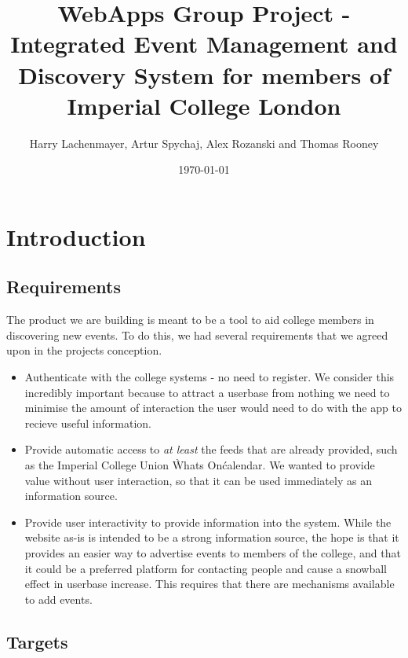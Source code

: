 \documentclass[11pt]{article}
\begin{document}
\title{WebApps Group Project - Integrated Event Management and Discovery System for members of Imperial College London}

\author{Harry Lachenmayer, Artur Spychaj, Alex Rozanski and Thomas Rooney}

\date{\today}         %

\maketitle            %

\section {Introduction}

\subsection {Requirements}

The product we are building is meant to be a tool to aid college members in discovering new events. To do this, we had several requirements that we agreed upon in the projects conception.

\begin{itemize}
\item Authenticate with the college systems - no need to register. We consider this incredibly important because to attract a userbase from nothing we need to minimise the amount of interaction the user would need to do with the app to recieve useful information.
\item Provide automatic access to \textit{at least} the feeds that are already provided, such as the Imperial College Union \`Whats On\' calendar. We wanted to provide value without user interaction, so that it can be used immediately as an information source.
\item Provide user interactivity to provide information into the system. While the website as-is is intended to be a strong information source, the hope is that it provides an easier way to advertise events to members of the college, and that it could be a preferred platform for contacting people and cause a snowball effect in userbase increase. This requires that there are mechanisms available to add events.
\end{itemize}

\subsection {Targets}
\end{document}
